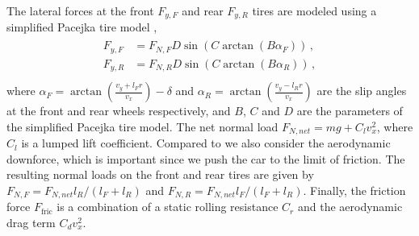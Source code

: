 The lateral forces at the front $F_{y,F}$ and rear $F_{y,R}$ tires are modeled using a simplified Pacejka tire model \cite{pacejka1992magic},
\begin{align}
\label{eq:lateral_forces}
\begin{split}
    F_{y,F} & = F_{N,F} D\sin{(C\arctan{(B\alpha_F)})}\,, \\
    F_{y,R} & = F_{N,R} D\sin{(C\arctan{(B\alpha_R)})}\,, \\
\end{split}
\end{align}
where $\alpha_F = \arctan{( \frac{v_y + l_F r}{v_x} )} - \delta$ and $\alpha_R = \arctan{( \frac{v_y - l_R r}{v_x})}$ are the slip angles at the front and rear wheels respectively, and $B$, $C$ and $D$ are the parameters of the simplified Pacejka tire model. The net normal load $F_{N,net} = m g + C_l v_x^2$, where $C_l$ is a lumped lift coefficient. Compared to \cite{vazquez2020optimization} we also consider the aerodynamic downforce, which is important since we push the car to the limit of friction. The resulting normal loads on the front and rear tires are given by $F_{N,F} = F_{N,net} l_R /(l_F + l_R) $ and $F_{N,R} = F_{N,net} l_F /(l_F + l_R)$. Finally, the friction force $F_{\text{fric}}$ is a combination of a static rolling resistance $C_r$ and the aerodynamic drag term $C_d v_x^2$.

